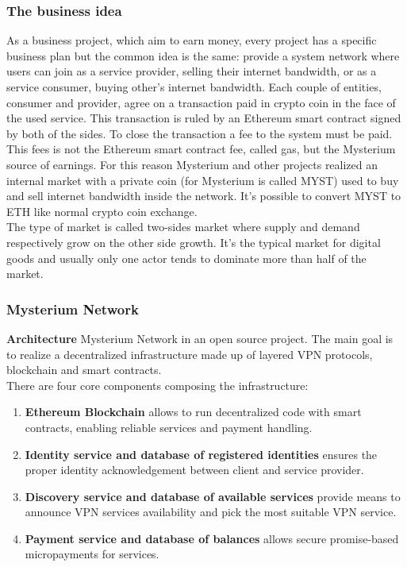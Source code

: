 \documentclass[]{article}
\begin{document}
	\subsubsection{The business idea}
	As a business project, which aim to earn money, every project has a specific business plan but the common idea is the same: provide a system network where users can join as a service provider, selling their internet bandwidth, or as a service consumer, buying other's internet bandwidth. Each couple of entities, consumer and provider, agree on a transaction paid in crypto coin in the face of the used service. This transaction is ruled by an Ethereum smart contract signed by both of the sides. To close the transaction a fee to the system must be paid. This fees is not the Ethereum smart contract fee, called gas, but the Mysterium source of earnings. For this reason Mysterium and other projects realized an internal market with a private coin (for Mysterium is called MYST) used to buy and sell internet bandwidth inside the network. It's possible to convert MYST to ETH like normal crypto coin exchange.\\
	The type of market is called two-sides market where supply and demand respectively grow on the other side growth. It's the typical market for digital goods and usually only one actor tends to dominate more than half of the market.
		
	\subsubsection{Mysterium Network}
	
	\textbf{Architecture}
	Mysterium Network in an open source project. The main goal is to realize a decentralized infrastructure made up of layered VPN protocols, blockchain and smart contracts.\\
	There are four core components composing the infrastructure:
	\begin{enumerate}
		\item \textbf{Ethereum Blockchain} allows to run decentralized code with smart contracts, enabling reliable
		services and payment handling.
		\item \textbf{Identity service and database of registered identities} ensures the proper identity
		acknowledgement between client and service provider.
		\item \textbf{Discovery service and database of available services} provide means to announce
		VPN services availability and pick the most suitable VPN service.
		\item \textbf{Payment service and database of balances} allows secure promise-based
		micropayments for services.
	\end{enumerate}
	
\end{document}
